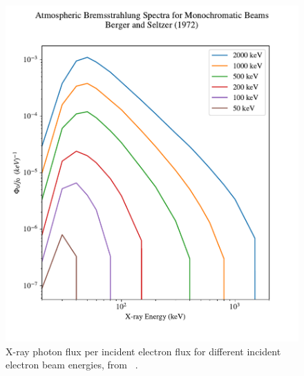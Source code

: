 \begin{figure}[p]
\label{berger_seltzer_curves_1}
\centering
\includegraphics[width=1.0\textwidth]{figures/chapter_3/berger-seltzer-curves/berger_seltzer_curves_1}
\caption{X-ray photon flux per incident electron flux for different incident electron beam energies, from ~\cite{Berger1972}. }
\end{figure}
